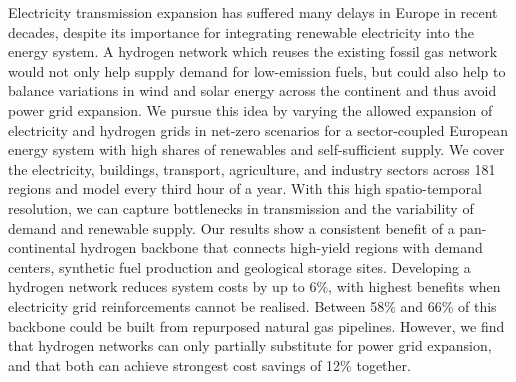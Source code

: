 Electricity transmission expansion has suffered many delays in Europe in recent
decades, despite its importance for integrating renewable electricity into the
energy system. A hydrogen network which reuses the existing fossil gas network
would not only help supply demand for low-emission fuels, but could also help to
balance variations in wind and solar energy across the continent and thus avoid
power grid expansion. We pursue this idea by varying the allowed expansion of
electricity and hydrogen grids in net-zero \co scenarios for a sector-coupled
European energy system with high shares of renewables and self-sufficient
supply. We cover the electricity, buildings, transport, agriculture, and
industry sectors across 181 regions and model every third hour of a year. With
this high spatio-temporal resolution, we can capture bottlenecks in transmission
and the variability of demand and renewable supply. Our results show a
consistent benefit of a pan-continental hydrogen backbone that connects
high-yield regions with demand centers, synthetic fuel production and geological
storage sites. Developing a hydrogen network reduces system costs by up to 6\%,
with highest benefits when electricity grid reinforcements cannot be realised.
Between 58\% and 66\% of this backbone could be built from repurposed natural gas
pipelines. However, we find that hydrogen networks can only partially substitute
for power grid expansion, and that both can achieve strongest cost savings of
12\% together.